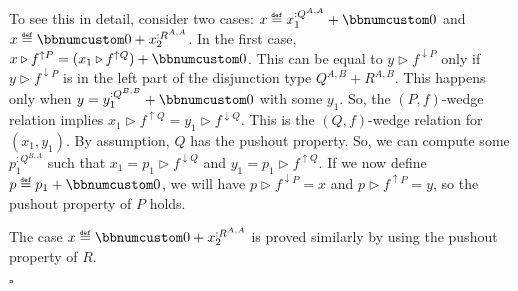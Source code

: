 To see this in detail, consider two cases: $x\triangleq x_{1}^{:Q^{A,A}}+\bbnum 0$
and $x\triangleq\bbnum 0+x_{2}^{:R^{A,A}}$. In the first case, $x\triangleright f^{\uparrow P}=(x_{1}\triangleright f^{\uparrow Q})+\bbnum 0$.
This can be equal to $y\triangleright f^{\downarrow P}$ only if $y\triangleright f^{\downarrow P}$
is in the left part of the disjunction type $Q^{A,B}+R^{A,B}$. This
happens only when $y=y_{1}^{:Q^{B,B}}+\bbnum 0$ with some $y_{1}$.
So, the $\left(P,f\right)$-wedge relation implies $x_{1}\triangleright f^{\uparrow Q}=y_{1}\triangleright f^{\downarrow Q}$.
This is the $\left(Q,f\right)$-wedge relation for $(x_{1},y_{1})$.
By assumption, $Q$ has the pushout property. So, we can compute some
$p_{1}^{:Q^{B,A}}$ such that $x_{1}=p_{1}\triangleright f^{\downarrow Q}$
and $y_{1}=p_{1}\triangleright f^{\uparrow Q}$. If we now define
$p\triangleq p_{1}+\bbnum 0$, we will have $p\triangleright f^{\downarrow P}=x$
and $p\triangleright f^{\uparrow P}=y$, so the pushout property of
$P$ holds.

The case $x\triangleq\bbnum 0+x_{2}^{:R^{A,A}}$ is proved similarly
by using the pushout property of $R$. %
\begin{comment}
\textbf{(f)} Rewrite the wedge relation for $x^{:S^{A,A,P^{A,A}}}$
and $y^{:S^{B,B,P^{B,B}}}$ by using the explicit liftings to $S$:
\[
x\triangleright f^{\uparrow S^{A,\bullet,P^{A,A}}}\bef\big(\overline{f^{\uparrow P^{A,\bullet}}}\big)^{\uparrow S^{A,B,\bullet}}=y\triangleright f^{\downarrow S^{\bullet,B,P^{B,B}}}\bef\big(\overline{f^{\downarrow P^{\bullet,B}}}\big)^{\uparrow S^{A,B,\bullet}}\quad.
\]
Due to the commutativity law of $S$, we may exchange the order of
compositions here:
\[
f^{\uparrow S^{A,\bullet,P^{A,B}}}\big(x\triangleright(f^{\uparrow P^{A,\bullet}})^{\uparrow S^{A,A,\bullet}}\big)=y\triangleright\big(\overline{f^{\downarrow P^{\bullet,B}}}\big)^{\uparrow S^{B,B,\bullet}}\triangleright f^{\downarrow S^{\bullet,B,P^{A,B}}}\quad.
\]
Now we can use the pushout property of $S$ to obtain some $z:S^{B,A,P^{A,B}}$
such that
\[
x\triangleright\big(\overline{f^{\uparrow P^{A,\bullet}}}\big)^{\uparrow S^{A,A,\bullet}}=z\triangleright f^{\downarrow S^{\bullet,A,P^{A,B}}}\text{ and }y\triangleright\big(\overline{f^{\downarrow P^{\bullet,B}}}\big)^{\uparrow S^{B,B,\bullet}}=z\triangleright f^{\uparrow S^{B,\bullet,P^{A,B}}}\quad.
\]
We need to produce a value $t:S^{B,A,P^{B,A}}$ such that 
\[
x=t\triangleright f^{\downarrow S^{\bullet,A,P^{B,A}}}\bef\big(\overline{f^{\downarrow P^{\bullet,A}}}\big)^{\uparrow S^{A,A,\bullet}}\text{ and }y=t\triangleright f^{\uparrow S^{B,\bullet,P^{B,A}}}\bef\big(\overline{f^{\uparrow P^{B,\bullet}}}\big)^{\uparrow S^{B,B,\bullet}}\quad.
\]
\end{comment}
$\square$

